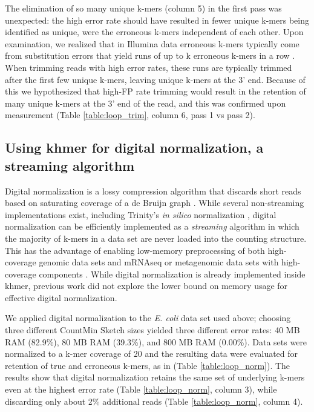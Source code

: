 \documentclass{article}
\begin{document}
The elimination of so many unique k-mers (column 5) in the first pass
was unexpected: the high error rate should have resulted in
fewer unique k-mers being identified as unique, were the erroneous
k-mers independent of each other. Upon examination, we realized that
in Illumina data erroneous k-mers typically come from substitution
errors that yield runs of up to k erroneous k-mers in a row \cite{Kelley2010}.  When trimming reads with high error rates,
these runs are typically trimmed after the first few unique k-mers,
leaving unique k-mers at the 3' end.
Because of this we hypothesized that high-FP rate trimming would
result in the retention of many unique k-mers at the 3' end of the
read, and this was confirmed upon measurement (Table \ref{table:loop_trim}, column 6, pass 1 vs
pass 2).

\subsection{Using khmer for digital normalization, a streaming algorithm}

Digital normalization is a lossy compression algorithm that discards
short reads based on saturating coverage of a de Bruijn graph
\cite{Brown2012}.  While several non-streaming implementations exist, including
Trinity's {\em in silico} normalization \cite{Haas2013,Brown2012blog}, digital normalization can be efficiently implemented as a {\em
  streaming} algorithm in which the majority of k-mers in a data set
are never loaded into the counting structure.  This has the advantage of enabling low-memory
preprocessing of both high-coverage genomic data sets and mRNAseq or
metagenomic data sets with high-coverage components \cite{Brown2012,
  Howe2012}.  While digital normalization is already
implemented inside khmer, previous work did not explore the lower bound
on memory usage for effective digital normalization.

We applied digital normalization to the {\em E. coli} data set used
above; choosing three different CountMin Sketch sizes yielded three different
error rates: 40 MB RAM (82.9\%), 80 MB RAM (39.3\%), and 800 MB RAM
(0.00\%).  Data sets were normalized to a k-mer coverage of 20 and the
resulting data were evaluated for retention of true and erroneous
k-mers, as in \cite{Brown2012} (Table \ref{table:loop_norm}).  The results show that
digital normalization retains the same set of underlying
k-mers even at the highest error rate (Table \ref{table:loop_norm}, column 3), while discarding only
about 2\% additional reads (Table \ref{table:loop_norm}, column 4).
\end{document}
